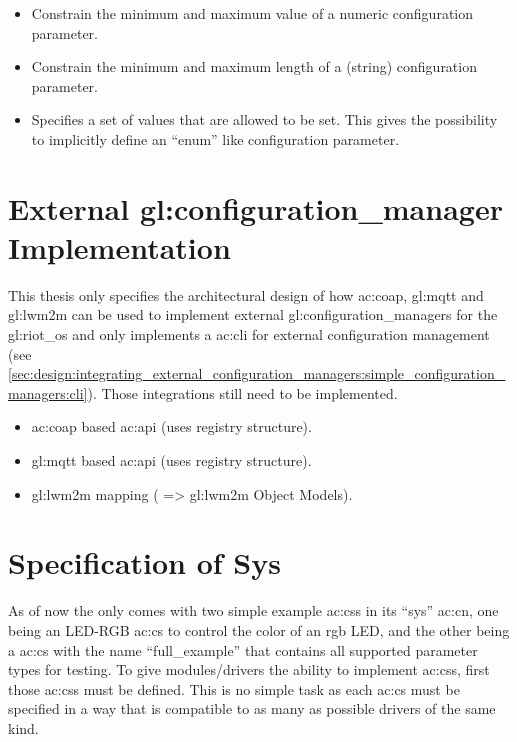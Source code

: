 \begin{itemize}
    \item Constrain the minimum and maximum value of a numeric configuration parameter.

    \item Constrain the minimum and maximum length of a (string) configuration parameter.

    \item Specifies a set of values that are allowed to be set.
          This gives the possibility to implicitly define an ``enum'' like configuration parameter.
\end{itemize}

\section{External \gls*{gl:configuration_manager} Implementation}

This thesis only specifies the architectural design of how \gls{ac:coap}, \gls{gl:mqtt} and \gls{gl:lwm2m} can be used to implement external \glspl{gl:configuration_manager} for the \gls{gl:riot_os} and only implements a \gls{ac:cli} for external configuration management (see \autoref{sec:design:integrating_external_configuration_managers:simple_configuration_managers:cli}).
Those integrations still need to be implemented.

\begin{itemize}
    \item \gls{ac:coap} based \gls{ac:api} (uses registry structure).

    \item \gls{gl:mqtt} based \gls{ac:api} (uses registry structure).

    \item \gls{gl:lwm2m} mapping ( => \gls{gl:lwm2m} Object Models).
\end{itemize}

\section{Specification of Sys }
\label{sec:future_work:specification_of_schemas_for_common_use_cases}

As of now the  only comes with two simple example \glspl{ac:cs} in its ``sys'' \gls{ac:cn}, one being an LED-RGB \gls{ac:cs} to control the color of an rgb LED, and the other being a \gls{ac:cs} with the name ``full\_example'' that contains all supported parameter types for testing.
To give modules/drivers the ability to implement \glspl{ac:cs}, first those \glspl{ac:cs} must be defined.
This is no simple task as each \gls{ac:cs} must be specified in a way that is compatible to as many as possible drivers of the same kind.

